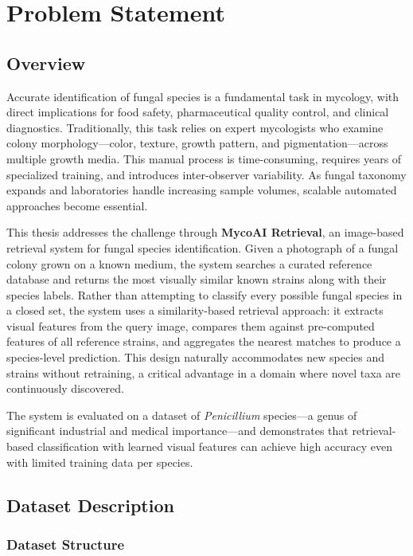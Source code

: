 \section{Problem Statement}\label{chapter-1-problem-statement}

\subsection{Overview}\label{overview}

Accurate identification of fungal species is a fundamental task in mycology, with direct implications for food safety, pharmaceutical quality control, and clinical diagnostics. Traditionally, this task relies on expert mycologists who examine colony morphology---color, texture, growth pattern, and pigmentation---across multiple growth media. This manual process is time-consuming, requires years of specialized training, and introduces inter-observer variability. As fungal taxonomy expands and laboratories handle increasing sample volumes, scalable automated approaches become essential.

This thesis addresses the challenge through \textbf{MycoAI Retrieval}, an image-based retrieval system for fungal species identification. Given a photograph of a fungal colony grown on a known medium, the system searches a curated reference database and returns the most visually similar known strains along with their species labels. Rather than attempting to classify every possible fungal species in a closed set, the system uses a similarity-based retrieval approach: it extracts visual features from the query image, compares them against pre-computed features of all reference strains, and aggregates the nearest matches to produce a species-level prediction. This design naturally accommodates new species and strains without retraining, a critical advantage in a domain where novel taxa are continuously discovered.

The system is evaluated on a dataset of \emph{Penicillium} species---a genus of significant industrial and medical importance---and demonstrates that retrieval-based classification with learned visual features can achieve high accuracy even with limited training data per species.

\subsection{Dataset Description}\label{dataset-description}

\subsubsection{Dataset Structure}\label{dataset-structure}

